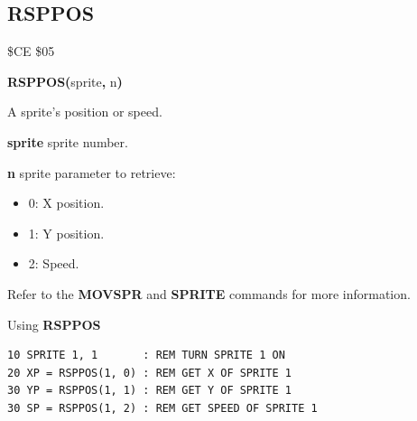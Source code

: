 
\newpage
\subsection{RSPPOS}
\begin{description}[leftmargin=2cm,style=nextline]
\item [Token:]    \$CE \$05

\item [Format:]   {\bf RSPPOS(}sprite{\bf,} n{\bf)}

\item [Returns:]  A sprite's position or speed.

                  {\bf sprite} sprite number.

                  {\bf n} sprite parameter to retrieve:

                  \begin{itemize}
                     \item 0: X position.
                     \item 1: Y position.
                     \item 2: Speed.
                  \end{itemize}

\item [Remarks:]  Refer to the {\bf MOVSPR} and {\bf SPRITE} commands for more information.

\item [Example:]  Using {\bf RSPPOS}
\begin{tcolorbox}[colback=black,coltext=white]
\verbatimfont{\codefont}
\begin{verbatim}
10 SPRITE 1, 1       : REM TURN SPRITE 1 ON
20 XP = RSPPOS(1, 0) : REM GET X OF SPRITE 1
30 YP = RSPPOS(1, 1) : REM GET Y OF SPRITE 1
30 SP = RSPPOS(1, 2) : REM GET SPEED OF SPRITE 1
\end{verbatim}
\end{tcolorbox}
\end{description}


\newpage
